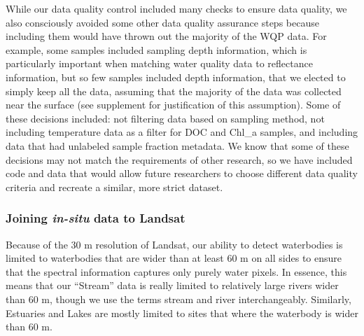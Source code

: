 \documentclass[]{article}
\begin{document}
While our data quality control included many checks to ensure data
quality, we also consciously avoided some other data quality assurance
steps because including them would have thrown out the majority of the
WQP data. For example, some samples included sampling depth information,
which is particularly important when matching water quality data to
reflectance information, but so few samples included depth information,
that we elected to simply keep all the data, assuming that the majority
of the data was collected near the surface (see supplement for
justification of this assumption). Some of these decisions included: not
filtering data based on sampling method, not including temperature data
as a filter for DOC and Chl\_a samples, and including data that had
unlabeled sample fraction metadata. We know that some of these decisions
may not match the requirements of other research, so we have included
code and data that would allow future researchers to choose different
data quality criteria and recreate a similar, more strict dataset.

\hypertarget{joining-in-situ-data-to-landsat}{%
\subsubsection{\texorpdfstring{Joining \emph{in-situ} data to
Landsat}{Joining in-situ data to Landsat}}\label{joining-in-situ-data-to-landsat}}

Because of the 30 m resolution of Landsat, our ability to detect
waterbodies is limited to waterbodies that are wider than at least 60 m
on all sides to ensure that the spectral information captures only
purely water pixels. In essence, this means that our ``Stream'' data is
really limited to relatively large rivers wider than 60 m, though we use
the terms stream and river interchangeably. Similarly, Estuaries and
Lakes are mostly limited to sites that where the waterbody is wider than
60 m.
\end{document}
